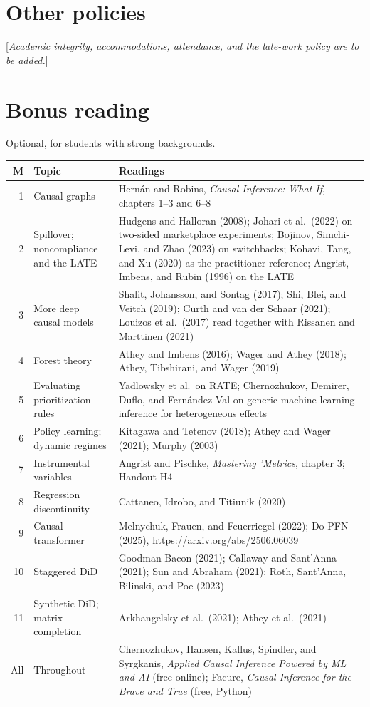 \documentclass[11pt]{article}
\newcommand{\tbd}[1]{\textcolor{warnred}{[\emph{#1}]}}
\begin{document}
\section*{Other policies}

\tbd{Academic integrity, accommodations, attendance, and the late-work policy are to be added.}

\section*{Bonus reading}

Optional, for students with strong backgrounds.

\begin{center}
\small
\begin{tabular}{rL{3.6cm}L{9.6cm}}
\toprule
\textbf{M} & \textbf{Topic} & \textbf{Readings} \\
 & Causal graphs & Hern\'an and Robins, \emph{Causal Inference: What If}, chapters 1--3 and 6--8 \\
2 & Spillover; noncompliance and the LATE & Hudgens and Halloran (2008); Johari et al.\ (2022) on two-sided marketplace experiments; Bojinov, Simchi-Levi, and Zhao (2023) on switchbacks; Kohavi, Tang, and Xu (2020) as the practitioner reference; Angrist, Imbens, and Rubin (1996) on the LATE \\
3 & More deep causal models & Shalit, Johansson, and Sontag (2017); Shi, Blei, and Veitch (2019); Curth and van der Schaar (2021); Louizos et al.\ (2017) read together with Rissanen and Marttinen (2021) \\
4 & Forest theory & Athey and Imbens (2016); Wager and Athey (2018); Athey, Tibshirani, and Wager (2019) \\
5 & Evaluating prioritization rules & Yadlowsky et al.\ on RATE; Chernozhukov, Demirer, Duflo, and Fern\'andez-Val on generic machine-learning inference for heterogeneous effects \\
6 & Policy learning; dynamic regimes & Kitagawa and Tetenov (2018); Athey and Wager (2021); Murphy (2003) \\
7 & Instrumental variables & Angrist and Pischke, \emph{Mastering 'Metrics}, chapter 3; Handout H4 \\
8 & Regression discontinuity & Cattaneo, Idrobo, and Titiunik (2020) \\
9 & Causal transformer & Melnychuk, Frauen, and Feuerriegel (2022); Do-PFN (2025), \url{https://arxiv.org/abs/2506.06039} \\
10 & Staggered DiD & Goodman-Bacon (2021); Callaway and Sant'Anna (2021); Sun and Abraham (2021); Roth, Sant'Anna, Bilinski, and Poe (2023) \\
11 & Synthetic DiD; matrix completion & Arkhangelsky et al.\ (2021); Athey et al.\ (2021) \\
All & Throughout & Chernozhukov, Hansen, Kallus, Spindler, and Syrgkanis, \emph{Applied Causal Inference Powered by ML and AI} (free online); Facure, \emph{Causal Inference for the Brave and True} (free, Python) \\
\bottomrule
\end{tabular}
\end{center}
\end{document}
